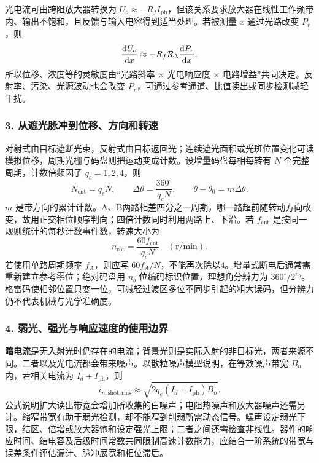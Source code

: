 光电流可由跨阻放大器转换为 $U_o\approx-R_fI_{\mathrm{ph}}$，但该关系要求放大器在线性工作频带内、输出不饱和，且反馈与输入电容得到适当处理。若被测量 $x$ 通过光路改变 $P_r$，则
\[
\frac{\mathrm{d} U_o}{\mathrm{d} x}\approx
-R_f\mathcal R_\lambda\frac{\mathrm{d} P_r}{\mathrm{d} x}.
\]
所以位移、浓度等的灵敏度由“光路斜率 $\times$ 光电响应度 $\times$ 电路增益”共同决定。反射率、污染、光源波动也会改变 $P_r$，可通过参考通道、比值读出或同步检测减轻干扰。

\subsubsection*{3. 从遮光脉冲到位移、方向和转速}
对射式由目标遮断光束，反射式由目标返回光；连续遮光面积或光斑位置变化可读模拟位移，周期光栅与码盘则把运动变成计数。设增量码盘每相每转有 $N$ 个完整周期，计数倍频因子 $q_c=1,2,4$，则
\[
N_{\mathrm{cnt}}=q_cN,\qquad
\Delta\theta=\frac{360^\circ}{q_cN},\qquad
\theta-\theta_0=m\Delta\theta.
\]
$m$ 是带方向的累计计数。A、B两路相差四分之一周期，哪一路超前随转动方向改变，故用正交相位顺序判向；四倍计数同时利用两路上、下沿。若 $f_{\mathrm{cnt}}$ 是按同一规则统计的每秒计数事件数，转速大小为
\[
n_{\mathrm{rot}}=\frac{60f_{\mathrm{cnt}}}{q_cN}\quad(\mathrm{r/min}).
\]
若使用单路周期频率 $f_A$，则应写 $60f_A/N$，不能再次除以4。增量式断电后通常需重新建立参考零位；绝对码盘用 $n_b$ 位编码标识位置，理想角分辨力为 $360^\circ/2^{n_b}$。格雷码使相邻位置只变一位，可减轻过渡区多位不同步引起的粗大误码，但分辨力仍不代表机械与光学准确度。

\subsubsection*{4. 弱光、强光与响应速度的使用边界}
\textbf{暗电流}是无入射光时仍存在的电流；背景光则是实际入射的非目标光，两者来源不同。二者以及光电流都会带来噪声。以散粒噪声模型说明，在等效噪声带宽 $B_n$ 内，若相关电流为 $I_d+I_{\mathrm{ph}}$，则
\[
i_{n,\mathrm{shot,rms}}\approx
\sqrt{2q_e(I_d+I_{\mathrm{ph}})B_n}.
\]
公式说明扩大读出带宽会增加所收集的白噪声；电阻热噪声和放大器噪声还需另计。缩窄带宽有助于弱光检测，却不能窄到削弱所需动态信号。噪声设定弱光下限，结区、倍增或放大器饱和设定强光上限；二者之间还需检查非线性。器件的响应时间、结电容及后级时间常数共同限制高速计数能力，应结合\hyperref[kn:3-2]{一阶系统的带宽与误差条件}评估漏计、脉冲展宽和相位滞后。

